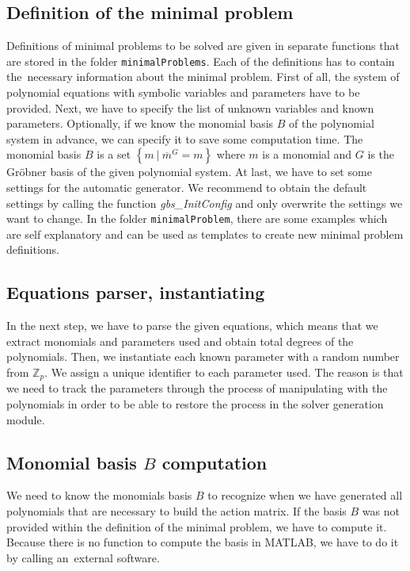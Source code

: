 \subsection{Definition of the minimal problem}
\label{subsec:MinimalProblemDefinition}
Definitions of minimal problems to be solved are given in separate functions that are stored in the folder \texttt{minimalProblems}. Each of the definitions has to contain the~necessary information about the minimal problem. First of all, the system of polynomial equations with symbolic variables and parameters have to be provided. Next, we have to specify the list of unknown variables and known parameters. Optionally, if we know the monomial basis $B$ of the polynomial system in advance, we can specify it to save some computation time. The monomial basis $B$ is a set $\left\{m\ |\ \overline{m}^G = m\right\}$ where $m$ is a monomial and $G$ is the Gr\"obner basis of the given polynomial system. At last, we have to set some settings for the automatic generator. We recommend to obtain the default settings by calling the function \textit{gbs\_InitConfig} and only overwrite the settings we want to change. In the folder \texttt{minimalProblem}, there are some examples which are self explanatory and can be used as templates to create new minimal problem definitions.

\subsection{Equations parser, instantiating}
In the next step, we have to parse the given equations, which means that we extract monomials and parameters used and obtain total degrees of the polynomials. Then, we instantiate each known parameter with a random number from $\mathbb{Z}_p$. We assign a unique identifier to each parameter used. The reason is that we need to track the parameters through the process of manipulating with the polynomials in order to be able to restore the process in the solver generation module.

\subsection{Monomial basis $B$ computation}
We need to know the monomials basis $B$ to recognize when we have generated all polynomials that are necessary to build the action matrix. If the basis $B$ was not provided within the definition of the minimal problem, we have to compute it. Because there is no function to compute the basis in MATLAB, we have to do it by calling an~external software.

